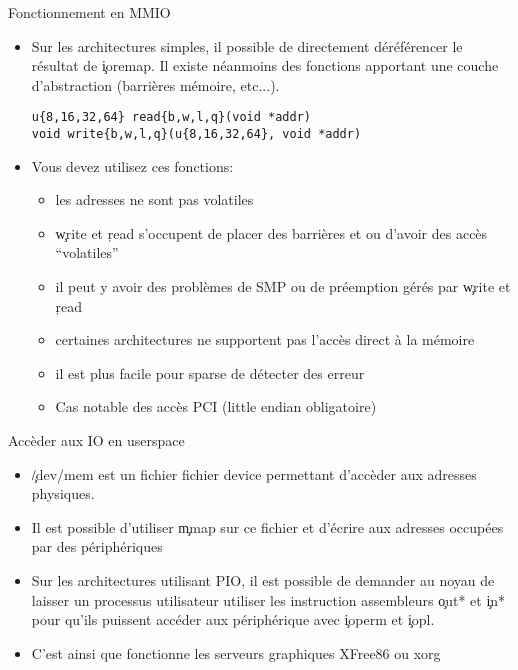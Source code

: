 \begin{frame}[fragile=singleslide]{Fonctionnement en MMIO}
  \begin{itemize} 
  \item  Sur les  architectures  simples, il  possible de  directement
    déréférencer le résultat de  \c{ioremap}.  Il existe néanmoins des
    fonctions apportant  une couche d'abstraction  (barrières mémoire,
    etc...).
    \begin{lstlisting}  
u{8,16,32,64} read{b,w,l,q}(void *addr)
void write{b,w,l,q}(u{8,16,32,64}, void *addr)
    \end{lstlisting} 
  \item Vous  devez utilisez ces  fonctions: 
    \begin{itemize} 
    \item les adresses ne sont pas volatiles
    \item \c{write} et \c{read}  s'occupent de placer des barrières et
      ou d'avoir des accès ``volatiles''
    \item il peut y avoir des  problèmes de SMP ou de préemption gérés
      par \c{write} et \c{read}
    \item certaines  architectures ne supportent pas  l'accès direct à
      la mémoire
    \item il est plus facile pour sparse de détecter des erreur
    \item Cas notable des accès PCI (little endian obligatoire)
    \end{itemize}
  \end{itemize} 
\end{frame} 


\begin{frame}[fragile=singleslide]{Accèder aux IO en userspace}
  \begin{itemize} 
  \item  \c{/dev/mem}   est  un  fichier   fichier  device  permettant
    d'accèder aux adresses physiques.
  \item Il est possible d'utiliser \c{mmap} sur ce fichier et d'écrire
    aux adresses occupées par des périphériques
  \item  Sur  les architectures  utilisant  PIO,  il  est possible  de
    demander au noyau de laisser un processus utilisateur utiliser les
    instruction assembleurs  \c{out*} et \c{in*}  pour qu'ils puissent
    accéder aux périphérique avec \c{ioperm} et \c{iopl}.
  \item C'est ainsi que  fonctionne les serveurs graphiques XFree86 ou
    xorg
  \end{itemize} 
\end{frame} 

